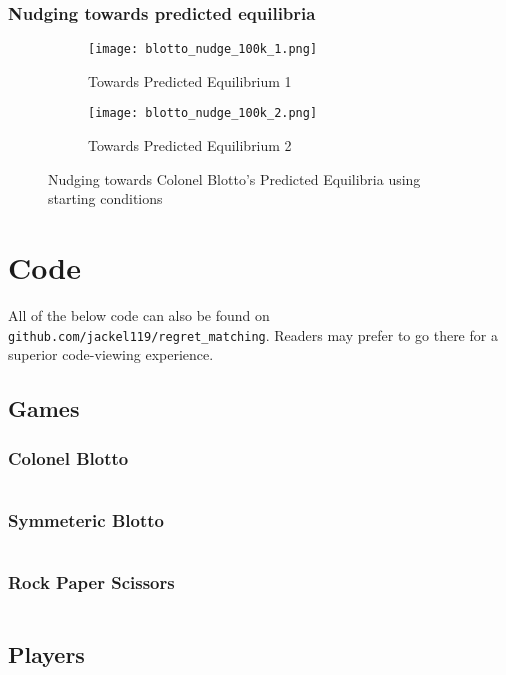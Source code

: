 \documentclass [11pt]{article}
\begin{document}
\subsubsection{Nudging towards predicted equilibria} \label{appendix:blotto-nudge-1}

\begin{figure}[H]
  \centering
  \begin{subfigure}[b]{0.45\textwidth}
    \centering
    \texttt{[image: blotto\_nudge\_100k\_1.png]}
    \caption{Towards Predicted Equilibrium 1}
  \end{subfigure}
  \begin{subfigure}[b]{0.45\textwidth}
    \centering
    \texttt{[image: blotto\_nudge\_100k\_2.png]}
    \caption{Towards Predicted Equilibrium 2}
  \end{subfigure}

  \caption{Nudging towards Colonel Blotto's Predicted Equilibria using starting conditions}
\end{figure}

\pagebreak
\section{Code}

All of the below code can also be found on \texttt{github.com/jackel119/regret\_matching}. Readers may prefer to go there for a superior code-viewing experience.

\subsection{Games}
\subsubsection{Colonel Blotto}
\inputminted{python}{code/colonel_blotto.py}
\subsubsection{Symmeteric Blotto}
\inputminted{python}{code/symmetric_blotto.py}
\subsubsection{Rock Paper Scissors}
\inputminted{python}{code/rock_paper_scissors.py}

\subsection{Players}
\end{document}
